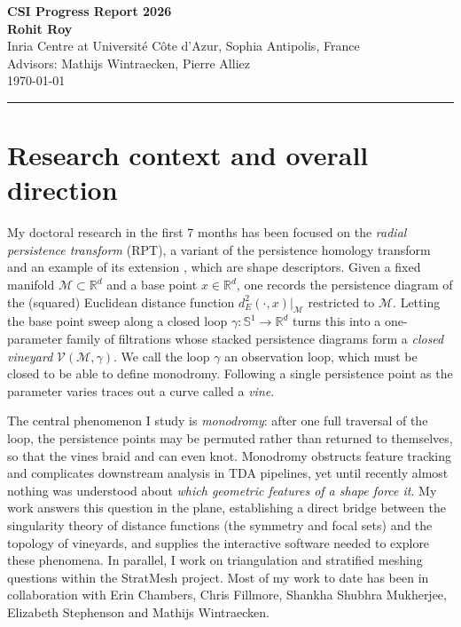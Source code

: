 \documentclass[10pt]{article}
\newcommand{\R}{\mathbb{R}}
\newcommand{\Sone}{\mathbb{S}^1}
\newcommand{\M}{\mathcal{M}}
\newcommand{\dist}{d_E}
\begin{document}
\begin{center}
  {\LARGE\bfseries CSI Progress Report 2026}\\[0.4em]
  {\normalsize\bfseries Rohit Roy}\\[0.2em]
  Inria Centre at Universit\'e C\^ote d'Azur, Sophia Antipolis, France\\[0.2em]
  {\small Advisors: Mathijs Wintraecken, Pierre Alliez}\\[0.2em]
  {\small \today}
\end{center}

\vspace{0.4em}
\hrule
\vspace{0.8em}

\section{Research context and overall direction}

My doctoral research in the first 7 months has been focused on the \emph{radial persistence transform} (RPT), a variant of the persistence homology transform \cite{arya2024decomposing} and an example of its extension \cite{onus2024shoving}, which are shape descriptors. Given a fixed manifold $\M \subset \R^d$ and a base point $x \in \R^d$, one records the persistence diagram of the (squared) Euclidean distance function $\dist^2(\cdot,x)|_\M$ restricted to $\M$. Letting the base point sweep along a closed loop $\gamma\colon \Sone \to \R^d$ turns this into a one-parameter family of filtrations whose stacked persistence diagrams form a \emph{closed vineyard} $\mathcal V(\M,\gamma)$. We call the loop $\gamma$ an observation loop, which must be closed to be able to define monodromy. Following a single persistence point as the parameter varies traces out a curve called a \emph{vine}.

The central phenomenon I study is \emph{monodromy}: after one full traversal of the loop, the persistence points may be permuted rather than returned to themselves, so that the vines braid and can even knot. Monodromy obstructs feature tracking and complicates downstream analysis in TDA pipelines, yet until recently almost nothing was understood about \emph{which geometric features of a shape force it}. My work answers this question in the plane, establishing a direct bridge between the singularity theory of distance functions (the symmetry and focal sets) and the topology of vineyards, and supplies the interactive software needed to explore these phenomena. In parallel, I work on triangulation and stratified meshing questions within the StratMesh project. Most of my work to date has been in collaboration with Erin Chambers, Chris Fillmore, Shankha Shubhra Mukherjee, Elizabeth Stephenson and Mathijs Wintraecken.
\end{document}
